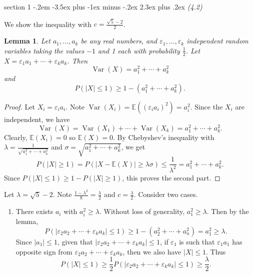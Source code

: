 \documentclass[12pt]{article}
\makeatletter
\theoremstyle{norm}
\newtheorem{lem}[thm]{Lemma}
\newcommand{\E}[0]{\mathbb{E}}
\newcommand{\rc}[1]{\frac{1}{#1}}
\newcommand{\ep}[0]{\varepsilon}
\newcommand{\la}[0]{\lambda}
\newcommand{\si}[0]{\sigma}
\newcommand{\Var}{\operatorname{Var}}
\newenvironment{problem}{\@startsection
       {section}
       {1}
       {-.2em}
       {-3.5ex plus -1ex minus -.2ex}
       {2.3ex plus .2ex}
       {\pagebreak[3]%
       \large\bf\noindent{Problem }
       }
       }
       {%
       }
\makeatother
\begin{document}
\begin{problem} {\it (4.2)}

We show the inequality with $c=\frac{\sqrt{5}-2}{2}$.
\begin{lem}
Let $a_1,\ldots, a_k$ be any real numbers, and $\ep_1,\ldots, \ep_k$ independent random variables taking the values $-1$ and 1 each with probability $\rc2$. Let $X=\ep_1a_1+\cdots +\ep_ka_k$. Then
\[
\Var(X)=a_1^2+\cdots +a_k^2
\]
and
\[
P(|X|\le 1)\ge 1-(a_1^2+\cdots +a_k^2).
\]
\end{lem}
\begin{proof}
Let $X_i=\ep_ia_i$. Note $\Var(X_i)=\E((\ep_ia_i)^2)=a_i^2$. 
Since the $X_i$ are independent, we have
\[
\Var(X)=\Var(X_1)+\cdots +\Var(X_k)=a_1^2+\cdots +a_k^2.
\]
Clearly, $\E(X_i)=0$ so $\E(X)=0$. By Chebyshev's inequality with $\la=\rc{\sqrt{a_1^2+\cdots +a_k^2}}$ and $\si=\sqrt{a_1^2+\cdots +a_k^2}$, we get
\[
P(|X|\ge 1)=P(|X-\E(X)|\ge \la \si)\le \rc{\la^2}= a_1^2+\cdots +a_k^2.
\]
Since $P(|X|\le 1)\ge 1-P(|X|\ge 1)$, this proves the second part.
\end{proof}

Let $\la=\sqrt 5-2$. Note %
$\frac{1-\la^2}{8}=\frac{\la}{2}$ and $c=\frac{\la}{2}$. Consider two cases.
\begin{enumerate}
\item
There exists $a_i$ with $a_i^2\ge \la$. Without loss of generality, $a_1^2\ge \la$. Then %
by the lemma,
\[
P(|\ep_2a_2+\cdots +\ep_ka_k|\le 1)%
\ge 1-(a_2^2+\cdots +a_n^2)=a_1^2\ge \la.
\]
Since $|a_1|\le 1$, given that $|\ep_2a_2+\cdots +\ep_ka_k|\le 1$, if $\ep_1$ is such that $\ep_1a_1$ has opposite sign from $\ep_2a_2+\cdots +\ep_ka_k$, then we also have $|X|\le 1$. Thus
\[
P(|X|\le 1)\ge\rc 2P(|\ep_2a_2+\cdots +\ep_ka_k|\le 1)\ge\frac{\la}{2}.
\]


\end{enumerate}
\end{problem}
\end{document}
